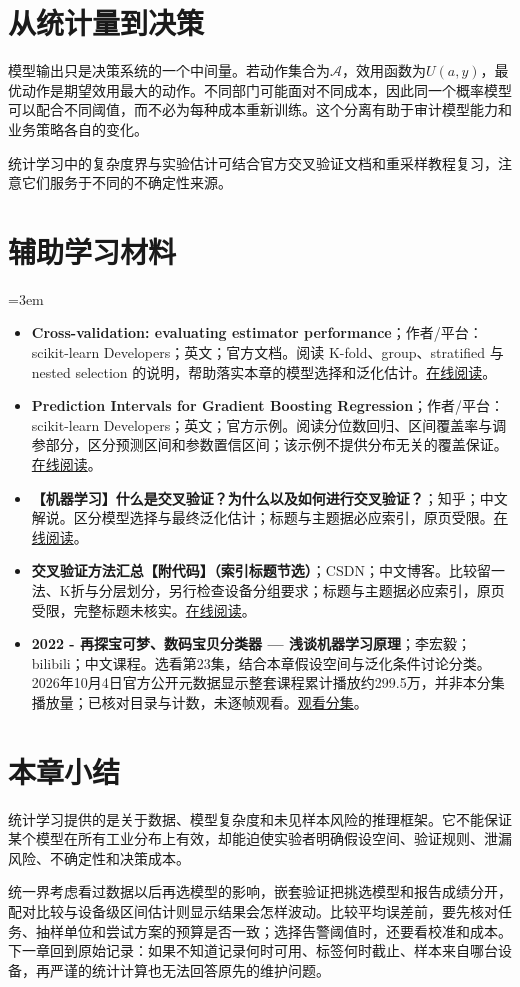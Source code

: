 \section{从统计量到决策}
模型输出只是决策系统的一个中间量。若动作集合为$\mathcal A$，效用函数为$U(a,y)$，最优动作是期望效用最大的动作。不同部门可能面对不同成本，因此同一个概率模型可以配合不同阈值，而不必为每种成本重新训练。这个分离有助于审计模型能力和业务策略各自的变化。

统计学习中的复杂度界与实验估计可结合官方交叉验证文档和重采样教程复习，注意它们服务于不同的不确定性来源。
\section*{辅助学习材料}
\begingroup
\emergencystretch=3em
\begin{itemize}
\item \textbf{Cross-validation: evaluating estimator performance}；作者/平台：scikit-learn Developers；英文；官方文档。阅读 K-fold、group、stratified 与 nested selection 的说明，帮助落实本章的模型选择和泛化估计。\href{https://scikit-learn.org/stable/modules/cross\_validation.html}{在线阅读}。
\item \textbf{Prediction Intervals for Gradient Boosting Regression}；作者/平台：scikit-learn Developers；英文；官方示例。阅读分位数回归、区间覆盖率与调参部分，区分预测区间和参数置信区间；该示例不提供分布无关的覆盖保证。\href{https://scikit-learn.org/stable/auto\_examples/ensemble/plot\_gradient\_boosting\_quantile.html}{在线阅读}。
\item \textbf{【机器学习】什么是交叉验证？为什么以及如何进行交叉验证？}；知乎；中文解说。区分模型选择与最终泛化估计；标题与主题据必应索引，原页受限。\href{https://zhuanlan.zhihu.com/p/81738187251}{在线阅读}。
\item \textbf{交叉验证方法汇总【附代码】（索引标题节选）}；CSDN；中文博客。比较留一法、K折与分层划分，另行检查设备分组要求；标题与主题据必应索引，原页受限，完整标题未核实。\href{https://blog.csdn.net/WHYbeHERE/article/details/108192957}{在线阅读}。
\item \textbf{2022 - 再探宝可梦、数码宝贝分类器 — 浅谈机器学习原理}；李宏毅；bilibili；中文课程。选看第23集，结合本章假设空间与泛化条件讨论分类。2026年10月4日官方公开元数据显示整套课程累计播放约299.5万，并非本分集播放量；已核对目录与计数，未逐帧观看。\href{https://www.bilibili.com/video/BV1Wv411h7kN/?p=23}{观看分集}。
\end{itemize}
\endgroup
\section{本章小结}
统计学习提供的是关于数据、模型复杂度和未见样本风险的推理框架。它不能保证某个模型在所有工业分布上有效，却能迫使实验者明确假设空间、验证规则、泄漏风险、不确定性和决策成本。

统一界考虑看过数据以后再选模型的影响，嵌套验证把挑选模型和报告成绩分开，配对比较与设备级区间估计则显示结果会怎样波动。比较平均误差前，要先核对任务、抽样单位和尝试方案的预算是否一致；选择告警阈值时，还要看校准和成本。下一章回到原始记录：如果不知道记录何时可用、标签何时截止、样本来自哪台设备，再严谨的统计计算也无法回答原先的维护问题。
